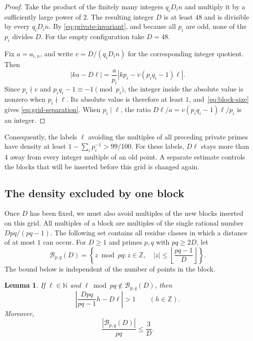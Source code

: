 \documentclass[11pt,reqno]{amsart}
\newtheorem{lemma}[theorem]{Lemma}
\theoremstyle{definition}
\theoremstyle{remark}
\numberwithin{equation}{section}
\newcommand{\N}{\mathbb N}
\newcommand{\Z}{\mathbb Z}
\begin{document}
\begin{proof}
Take the product of the finitely many integers $q_iD_i n$ and multiply
it by a sufficiently large power of $2$. The resulting integer $D$ is
at least $48$ and is divisible by every $q_iD_i n$. By
\eqref{eq:private-invariant}, and because all $p_i$ are odd, none of the
$p_i$ divides $D$. For the empty configuration take $D=48$.

Fix $a=a_{i,n}$, and write $v=D/(q_iD_i n)$ for the corresponding
integer quotient. Then
\begin{equation}\label{eq:integer-gap}
 |ka-D\ell|
   =\frac a{p_i}\left|kp_i-v(p_iq_i-1)\ell\right|.
\end{equation}
Since $p_i\nmid v$ and $p_iq_i-1\equiv-1\pmod{p_i}$, the integer
inside the absolute value is nonzero when $p_i\nmid\ell$. Its absolute
value is therefore at least $1$, and~\eqref{eq:block-size} gives
\eqref{eq:grid-separation}. When $p_i\mid\ell$, the ratio
$D\ell/a=v(p_iq_i-1)\ell/p_i$ is an integer.
\end{proof}

Consequently, the labels $\ell$ avoiding the multiples of all preceding
private primes have density at least $1-\sum_i p_i^{-1}>99/100$.
For these labels, $D\ell$ stays more than $4$ away from
every integer multiple of an old point. A separate estimate controls
the blocks that will be inserted before this grid is changed again.

\subsection{The density excluded by one block}

Once $D$ has been fixed, we must also avoid multiples of the new blocks
inserted on this grid. All multiples of a block are multiples of the
single rational number $Dpq/(pq-1)$. The following set contains all
residue classes in which a distance of at most $1$ can occur.
For $D\geq1$ and primes $p,q$ with $pq\geq2D$, let
\begin{equation}\label{eq:bad-residues}
 \mathcal B_{p,q}(D)=
 \left\{z\bmod pq:z\in\Z,\quad
 |z|\leq\left\lfloor\frac{pq-1}{D}\right\rfloor\right\}.
\end{equation}
The bound below is independent of the number of points in the block.

\begin{lemma}\label{lem:cost}
If $\ell\in\N$ and $\ell\bmod pq\notin\mathcal B_{p,q}(D)$, then
\[
 \left|\frac{Dpq}{pq-1}h-D\ell\right|>1
 \qquad(h\in\Z).
\]
Moreover,
\begin{equation}\label{eq:cost}
 \frac{|\mathcal B_{p,q}(D)|}{pq}\leq\frac3D.
\end{equation}
\end{lemma}
\end{document}
